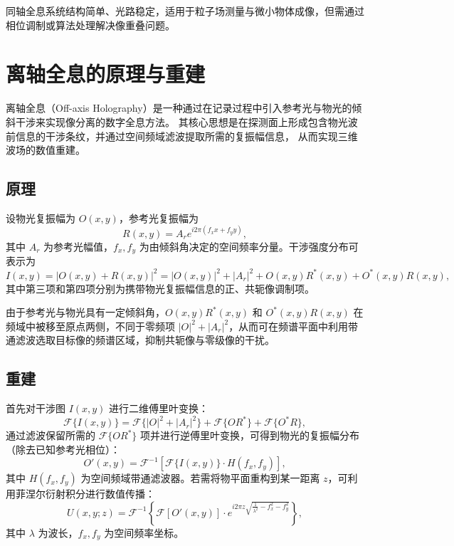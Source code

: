 \documentclass[a4paper,draft]{report}
\begin{document}
同轴全息系统结构简单、光路稳定，适用于粒子场测量与微小物体成像，但需通过相位调制或算法处理解决像重叠问题。

\section{离轴全息的原理与重建}
离轴全息（Off-axis Holography）是一种通过在记录过程中引入参考光与物光的倾斜干涉来实现像分离的数字全息方法。
其核心思想是在探测面上形成包含物光波前信息的干涉条纹，并通过空间频域滤波提取所需的复振幅信息，
从而实现三维波场的数值重建。
\subsection{原理}
设物光复振幅为 $O(x,y)$，参考光复振幅为
\begin{equation}
R(x,y) = A_r e^{i 2\pi (f_x x + f_y y)},
\end{equation}
其中 $A_r$ 为参考光幅值，$f_x, f_y$ 为由倾斜角决定的空间频率分量。干涉强度分布可表示为
\begin{equation}
I(x,y) = |O(x,y) + R(x,y)|^2 = |O(x,y)|^2 + |A_r|^2 + O(x,y) R^*(x,y) + O^*(x,y) R(x,y),
\end{equation}
其中第三项和第四项分别为携带物光复振幅信息的正、共轭像调制项。

由于参考光与物光具有一定倾斜角，$O(x,y) R^*(x,y)$ 和 $O^*(x,y) R(x,y)$ 在频域中被移至原点两侧，不同于零频项 $|O|^2 + |A_r|^2$，从而可在频谱平面中利用带通滤波选取目标像的频谱区域，抑制共轭像与零级像的干扰。
\subsection{重建}
首先对干涉图 $I(x,y)$ 进行二维傅里叶变换：
\begin{equation}
\mathcal{F}\{I(x,y)\} = \mathcal{F}\{|O|^2 + |A_r|^2\} + \mathcal{F}\{O R^*\} + \mathcal{F}\{O^* R\},
\end{equation}
通过滤波保留所需的 $\mathcal{F}\{O R^*\}$ 项并进行逆傅里叶变换，可得到物光的复振幅分布（除去已知参考光相位）：
\begin{equation}
O'(x,y) = \mathcal{F}^{-1} \left[ \mathcal{F}\{I(x,y)\} \cdot H(f_x,f_y) \right],
\end{equation}
其中 $H(f_x,f_y)$ 为空间频域带通滤波器。若需将物平面重构到某一距离 $z$，可利用菲涅尔衍射积分进行数值传播：
\begin{equation}
U(x,y;z) = \mathcal{F}^{-1} \left\{ \mathcal{F}[O'(x,y)] \cdot e^{i 2\pi z \sqrt{\frac{1}{\lambda^2} - f_x^2 - f_y^2}} \right\},
\end{equation}
其中 $\lambda$ 为波长，$f_x,f_y$ 为空间频率坐标。
\end{document}
